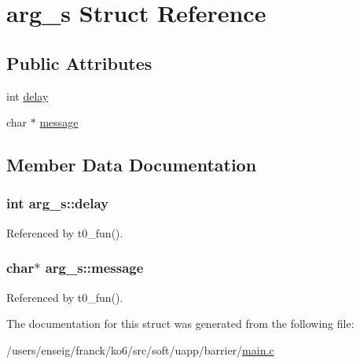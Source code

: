 \hypertarget{structarg__s}{\section{arg\-\_\-s Struct Reference}
\label{structarg__s}
}
\subsection*{Public Attributes}
\begin{DoxyCompactItemize}
\item 
int \hyperlink{structarg__s_a21f43fb97621a901d1c91a8f342977af}{delay}
\item 
char $\ast$ \hyperlink{structarg__s_ae742dba31a6d8711b649c3c5a9d41fd0}{message}
\end{DoxyCompactItemize}


\subsection{Member Data Documentation}
\hypertarget{structarg__s_a21f43fb97621a901d1c91a8f342977af}{
\subsubsection[{delay}]{\setlength{\rightskip}{0pt plus 5cm}int arg\-\_\-s\-::delay}}\label{structarg__s_a21f43fb97621a901d1c91a8f342977af}


Referenced by t0\-\_\-fun().

\hypertarget{structarg__s_ae742dba31a6d8711b649c3c5a9d41fd0}{
\subsubsection[{message}]{\setlength{\rightskip}{0pt plus 5cm}char$\ast$ arg\-\_\-s\-::message}}\label{structarg__s_ae742dba31a6d8711b649c3c5a9d41fd0}


Referenced by t0\-\_\-fun().



The documentation for this struct was generated from the following file\-:\begin{DoxyCompactItemize}
\item 
/users/enseig/franck/ko6/src/soft/uapp/barrier/\hyperlink{barrier_2main_8c}{main.\-c}\end{DoxyCompactItemize}
